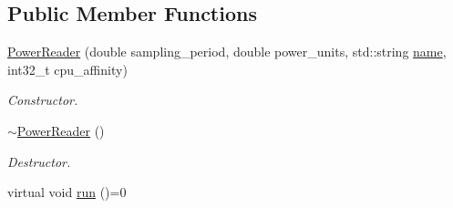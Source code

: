 \subsection*{Public Member Functions}
\begin{DoxyCompactItemize}
\item 
\hyperlink{classxmem_1_1power_1_1_power_reader_abae158275e32689c1c69a90b8962959b}{Power\+Reader} (double sampling\+\_\+period, double power\+\_\+units, std\+::string \hyperlink{classxmem_1_1power_1_1_power_reader_ac0f465b044512502eb1824f18d60e3e6}{name}, int32\+\_\+t cpu\+\_\+affinity)
\begin{DoxyCompactList}\small\item\em Constructor. \end{DoxyCompactList}\item 
\hypertarget{classxmem_1_1power_1_1_power_reader_ae3c8c415135bfa4b3ba150c2d9b931a3}{}\hyperlink{classxmem_1_1power_1_1_power_reader_ae3c8c415135bfa4b3ba150c2d9b931a3}{$\sim$\+Power\+Reader} ()\label{classxmem_1_1power_1_1_power_reader_ae3c8c415135bfa4b3ba150c2d9b931a3}

\begin{DoxyCompactList}\small\item\em Destructor. \end{DoxyCompactList}\item 
\hypertarget{classxmem_1_1power_1_1_power_reader_ad8286b3727efbcb0ff5049c6594d126a}{}virtual void \hyperlink{classxmem_1_1power_1_1_power_reader_ad8286b3727efbcb0ff5049c6594d126a}{run} ()=0\label{classxmem_1_1power_1_1_power_reader_ad8286b3727efbcb0ff5049c6594d126a}


\end{DoxyCompactItemize}
